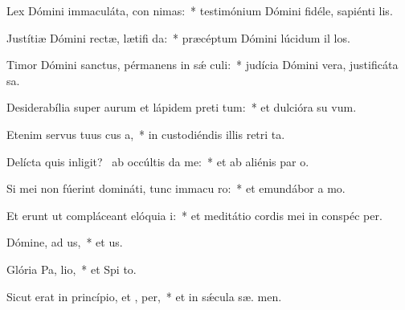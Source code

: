 \item Lex Dómini immaculáta, con nimas:~* testimónium Dómini fidéle, sapiénti  lis.
\item Justítiæ Dómini rectæ, lætifi da:~* præcéptum Dómini lúcidum il los.
\item Timor Dómini sanctus, pérmanens in sǽ culi:~* judícia Dómini vera, justificáta  sa.
\item Desiderabília super aurum et lápidem preti tum:~* et dulcióra su   vum.
\item Etenim servus tuus cus a,~* in custodiéndis illis retri ta.
\item Delícta quis inligit?~\pscross{} ab occúltis  da me:~* et ab aliénis par  o.
\item Si mei non fúerint domináti, tunc immacu ro:~* et emundábor a  mo.
\item Et erunt ut compláceant elóquia  i:~* et meditátio cordis mei in conspéc  per.
\item Dómine, ad us,~* et  us.
\item Glória Pa,  lio,~* et Spi to.
\item Sicut erat in princípio, et ,  per,~* et in sǽcula sæ. men.
